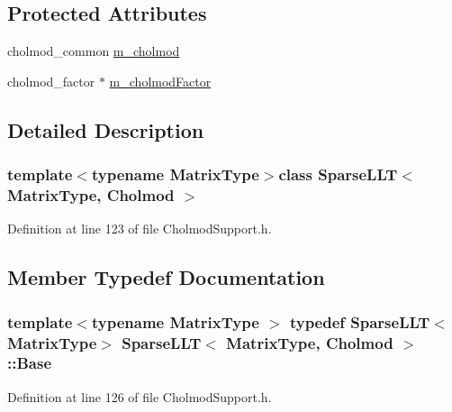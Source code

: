 \subsection*{Protected Attributes}
\begin{DoxyCompactItemize}
\item 
cholmod\-\_\-common \hyperlink{class_sparse_l_l_t_3_01_matrix_type_00_01_cholmod_01_4_a900bfc2a39bd5864c3cbae1076329943}{m\-\_\-cholmod}
\item 
cholmod\-\_\-factor $\ast$ \hyperlink{class_sparse_l_l_t_3_01_matrix_type_00_01_cholmod_01_4_ae0a136dd8db31629dd109bad15657c2a}{m\-\_\-cholmod\-Factor}
\end{DoxyCompactItemize}


\subsection{Detailed Description}
\subsubsection*{template$<$typename Matrix\-Type$>$class Sparse\-L\-L\-T$<$ Matrix\-Type, Cholmod $>$}



Definition at line 123 of file Cholmod\-Support.\-h.



\subsection{Member Typedef Documentation}
\hypertarget{class_sparse_l_l_t_3_01_matrix_type_00_01_cholmod_01_4_a575af95841f65bd4e510bc6adf91321e}{
\subsubsection[{Base}]{\setlength{\rightskip}{0pt plus 5cm}template$<$typename Matrix\-Type $>$ typedef {\bf Sparse\-L\-L\-T}$<$Matrix\-Type$>$ {\bf Sparse\-L\-L\-T}$<$ Matrix\-Type, {\bf Cholmod} $>$\-::{\bf Base}\hspace{0.3cm}{\ttfamily [protected]}}}\label{class_sparse_l_l_t_3_01_matrix_type_00_01_cholmod_01_4_a575af95841f65bd4e510bc6adf91321e}


Definition at line 126 of file Cholmod\-Support.\-h.

